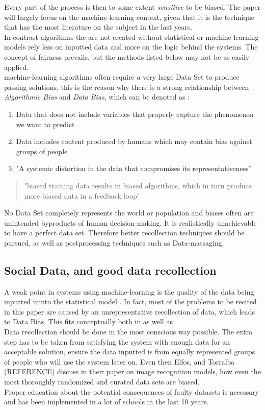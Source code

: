 Every part of the process is then to some extent \textsl{sensitive} to be biased.
The paper will largely focus on the machine-learning context, given that it is the technique that has the most literature on the subject in the last years.\\
In contrast algorithms the are not created without statistical or machine-learning models rely less on inputted data and more on the logic behind the systems. The concept of fairness prevails, but the methods listed below may not be as easily applied.\\
machine-learning algorithms often require a very large Data Set to produce passing solutions, this is the reason why there is a strong relationship between \textsl{Algorithmic Bias} and \textsl{Data Bias}\label{DataBias}, which can be denoted as :
\begin{enumerate}
  \item Data that does not include variables that properly capture the phenomenon we want to predict
  \item Data includes content produced by humans which may contain bias against groups of people
  \item "A systemic distortion in the data that compromises its representativeness” \cite{OCDK19}
\end{enumerate}
\begin{quote}"biased training data results in biased algorithms, which in turn produce more biased data in a feedback loop"\cite{GSC18} \end{quote}
No Data Set completely represents the world or population and biases often are unintended byproducts of human decision-making\cite{GSC18}. It is realistically unachievable to have a perfect data set. Therefore better recollection techniques should be pursued, as well as postprocessing techniques such as Data-massaging.
\subsection{Social Data, and good data recollection} %
A weak point in systems using machine-learning is the quality of the data being inputted ininto the statistical model \cite{Harv18}. In fact, most of the problems to be recited in this paper are caused by an unrepresentative recollection of data, which leads to Data Bias. This fits conceptually both in  as well as .\\
Data recollection should be done in the most conscious way possible. The extra step has to be taken from satisfying the system with enough data for an acceptable solution, ensure the data inputted is from equally represented groups of people who will use the system later on. Even then Elfos, and Torralba (REFERENCE) discuss in their paper on image recognition models, how even the most thoroughly randomized and curated data sets are biased.\\
Proper education about the potential consequences of faulty datasets is necessary and has been implemented in a lot of schools in the last 10 years\cite{MMS*19}\cite{HWD*19}.\\



